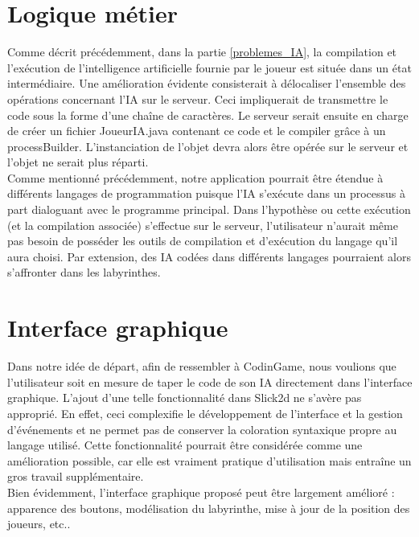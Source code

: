 \section{Logique métier}

	Comme décrit précédemment, dans la partie \ref{problemes_IA}, la compilation et l'exécution de l'intelligence artificielle fournie par le joueur est située dans un état intermédiaire. Une amélioration évidente consisterait à délocaliser l'ensemble des opérations concernant l'IA sur le serveur. Ceci impliquerait de transmettre le code sous la forme d'une chaîne de caractères. Le serveur serait ensuite en charge de créer un fichier JoueurIA.java contenant ce code et le compiler grâce à un processBuilder. L'instanciation de l'objet devra alors être opérée sur le serveur et l'objet ne serait plus réparti. \\

	Comme mentionné précédemment, notre application pourrait être étendue à différents langages de programmation puisque l'IA s'exécute dans un processus à part dialoguant avec le programme principal. Dans l'hypothèse ou cette exécution (et la compilation associée) s'effectue sur le serveur, l'utilisateur n'aurait même pas besoin de posséder les outils de compilation et d'exécution du langage qu'il aura choisi. Par extension, des IA codées dans différents langages pourraient alors s'affronter dans les labyrinthes.

\section{Interface graphique}

Dans notre idée de départ, afin de ressembler à CodinGame, nous voulions que l'utilisateur soit en mesure de taper le code de son IA directement dans l'interface graphique. L'ajout d'une telle fonctionnalité dans Slick2d ne s'avère pas approprié. En effet, ceci complexifie le développement de l'interface et la gestion d'événements et ne permet pas de conserver la coloration syntaxique propre au langage utilisé. Cette fonctionnalité pourrait être considérée comme une amélioration possible, car elle est vraiment pratique d'utilisation mais entraîne un gros travail supplémentaire.\\

Bien évidemment, l'interface graphique proposé peut être largement amélioré : apparence des boutons, modélisation du labyrinthe, mise à jour de la position des joueurs, etc..
